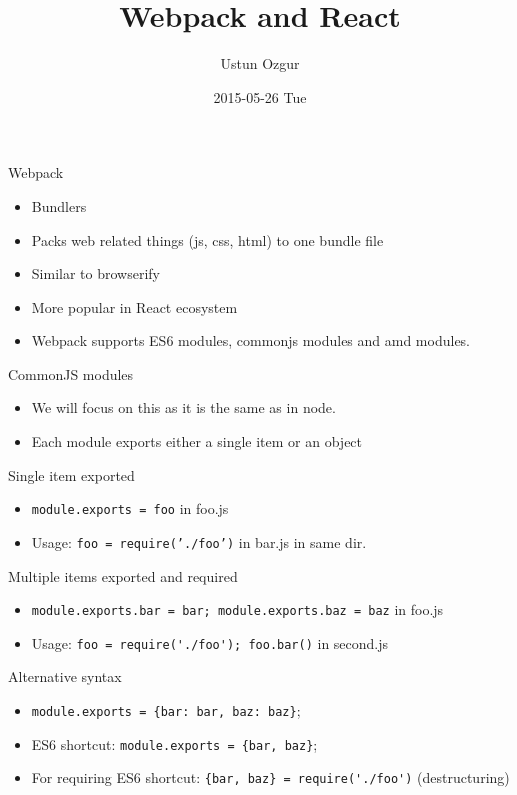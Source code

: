 \documentclass[presentation]{beamer}
\author{Ustun Ozgur}
\date{2015-05-26 Tue}
\title{Webpack and React}
\begin{document}
\maketitle

\begin{frame}[label=sec-1]{Webpack}
\begin{itemize}
\item Bundlers
\item Packs web related things (js, css, html) to one bundle file
\item Similar to browserify
\item More popular in React ecosystem
\item Webpack supports ES6 modules, commonjs modules and amd modules.
\end{itemize}
\end{frame}

\begin{frame}[label=sec-2]{CommonJS modules}
\begin{itemize}
\item We will focus on this as it is the same as in node.
\item Each module exports either a single item or an object
\end{itemize}
\end{frame}

\begin{frame}[fragile,label=sec-3]{Single item exported}
 \begin{itemize}
\item \verb~module.exports = foo~ in foo.js
\item Usage: \texttt{foo = require('./foo')} in bar.js in same dir.
\end{itemize}
\end{frame}

\begin{frame}[fragile,label=sec-4]{Multiple items exported and required}
 \begin{itemize}
\item \verb~module.exports.bar = bar; module.exports.baz = baz~ in foo.js
\item Usage: \verb~foo = require('./foo'); foo.bar()~ in second.js
\end{itemize}
\end{frame}

\begin{frame}[fragile,label=sec-5]{Alternative syntax}
 \begin{itemize}
\item \verb~module.exports = {bar: bar, baz: baz}~;

\item ES6 shortcut: \verb~module.exports = {bar, baz}~;

\item For requiring ES6 shortcut: \verb~{bar, baz} = require('./foo')~ (destructuring)
\end{itemize}
\end{frame}
\end{document}
